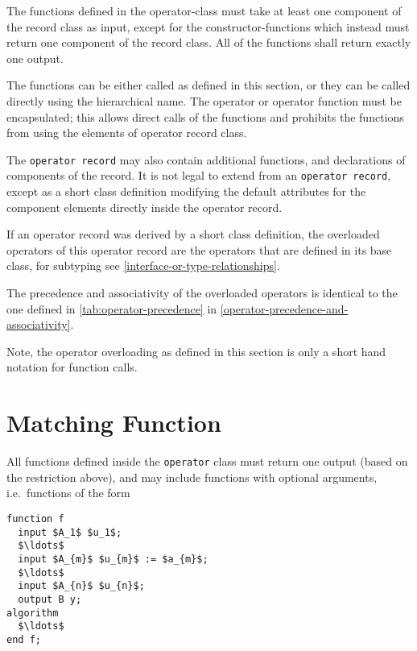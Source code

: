 The functions defined in the operator-class must take at least one
component of the record class as input, except for the
constructor-functions which instead must return one component of the
record class. All of the functions shall return exactly one output.

The functions can be either called as defined in this section, or they
can be called directly using the hierarchical name. The operator or
operator function must be encapsulated; this allows direct calls of the
functions and prohibits the functions from using the elements of
operator record class.

The \lstinline!operator record! may also contain additional functions, and
declarations of components of the record. It is not legal to extend from
an \lstinline!operator record!, except as a short class definition modifying the
default attributes for the component elements directly inside the
operator record.

If an operator record was derived by a short class definition, the
overloaded operators of this operator record are the operators that are
defined in its base class, for subtyping see \cref{interface-or-type-relationships}.

The precedence and associativity of the overloaded operators is
identical to the one defined in \cref{tab:operator-precedence} in \cref{operator-precedence-and-associativity}.

\begin{nonnormative}
Note, the operator overloading as defined in this section is
only a short hand notation for function calls.
\end{nonnormative}

\section{Matching Function}\label{matching-function}

All functions defined inside the \lstinline!operator! class must return one output (based on the restriction above), and may include functions with optional arguments, i.e.\ functions of the form
\begin{lstlisting}[language=modelica]
function f
  input $A_1$ $u_1$;
  $\ldots$
  input $A_{m}$ $u_{m}$ := $a_{m}$;
  $\ldots$
  input $A_{n}$ $u_{n}$;
  output B y;
algorithm
  $\ldots$
end f;
\end{lstlisting}

